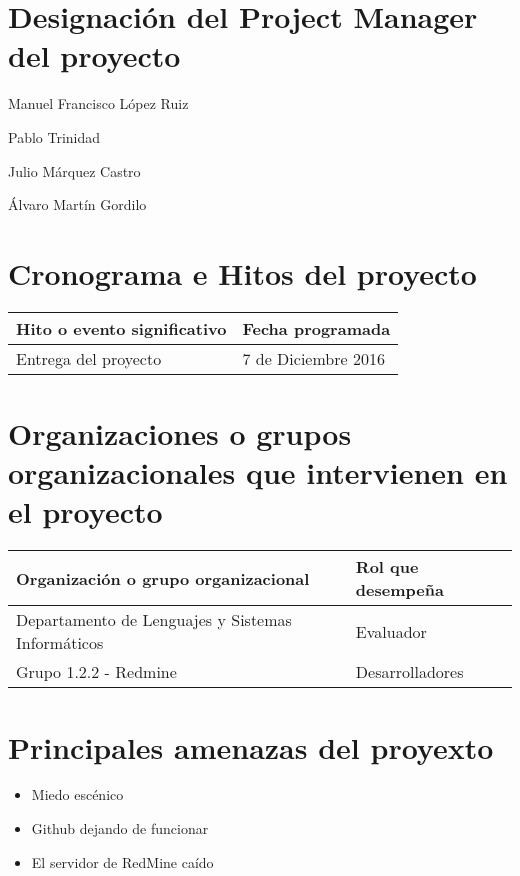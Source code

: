 \documentclass[a4paper,10pt]{scrartcl}
\begin{document}
\section{Designación del Project Manager del proyecto}

\begin{description}[align=right, labelwidth=4cm]
	\item [Nombre] Manuel Francisco López Ruiz
	\item [Reporta a] Pablo Trinidad
	\item [Supervisa a] Julio Márquez Castro
	\item [Supervisa a] Álvaro Martín Gordilo
\end{description}


\section{Cronograma e Hitos del proyecto}

\begin{center}
	\begin{tabular}{| l | l |}
		\hline	
		\textbf{Hito o evento significativo} & \textbf{Fecha programada} \\ \hline
 		Entrega del proyecto & 7 de Diciembre 2016 \\ \hline
	\end{tabular}
\end{center}

\section{Organizaciones o grupos organizacionales que intervienen en el proyecto}
\begin{center}
	\begin{tabular}{| l | l |}
		\hline	
		\textbf{Organización o grupo organizacional} & \textbf{Rol que desempeña} \\ \hline
		Departamento de Lenguajes y Sistemas Informáticos & Evaluador \\ \hline
		Grupo 1.2.2 - Redmine & Desarrolladores \\ \hline
	\end{tabular}
\end{center}

\section{Principales amenazas del proyexto}
\begin{itemize}
	\item Miedo escénico
	\item Github dejando de funcionar
	\item El servidor de RedMine caído
\end{itemize}
\end{document}
